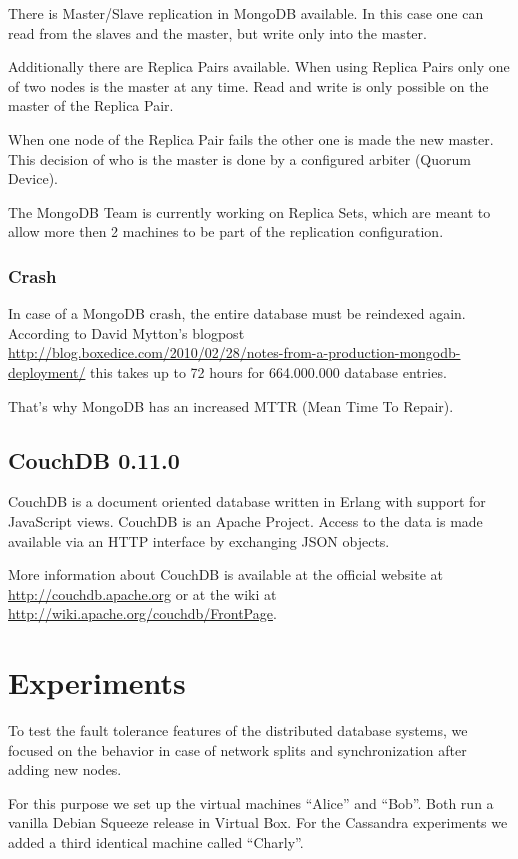 There is Master/Slave replication in MongoDB available. In this
case one can read from the slaves and the master, but write only
into the master.

Additionally there are Replica Pairs available. When using Replica
Pairs only one of two nodes is the master at any time. Read and
write is only possible on the master of the Replica Pair.

When one node of the Replica Pair fails the other one is made
the new master. This decision of who is the master is done by a
configured arbiter (Quorum Device).

The MongoDB Team is currently working on Replica Sets, which are
meant to allow more then 2 machines to be part of the replication
configuration.

\subsubsection{Crash}

In case of a MongoDB crash, the entire database must be reindexed
again. According to David Mytton's blogpost
\url{http://blog.boxedice.com/2010/02/28/notes-from-a-production-mongodb-deployment/}
this takes up to 72 hours for 664.000.000 database entries.

That's why MongoDB has an increased MTTR (Mean Time To Repair).

\subsection{CouchDB 0.11.0}

CouchDB is a document oriented database written in Erlang with
support for JavaScript views. CouchDB is an Apache Project.
Access to the data is made available via an HTTP interface by
exchanging JSON objects.

More information about CouchDB is available at the official website
at \url{http://couchdb.apache.org} or at the wiki at
\url{http://wiki.apache.org/couchdb/FrontPage}.

\section{Experiments}

To test the fault tolerance features of the distributed database
systems, we focused on the behavior in case of network splits and
synchronization after adding new nodes.

For this purpose we set up the virtual machines ``Alice'' and
``Bob''. Both run a vanilla Debian Squeeze release in Virtual Box.
For the Cassandra experiments we added a third identical machine
called ``Charly''.

